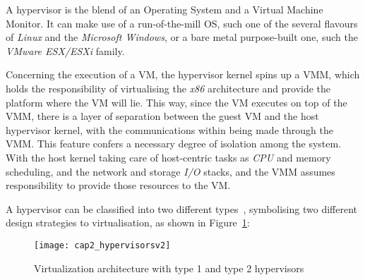 A hypervisor is the blend of an Operating System and a Virtual Machine Monitor. It can make use of a run-of-the-mill OS, such one of the several flavours of \textit{Linux} and the \textit{Microsoft Windows}, or a bare metal purpose-built one, such the \textit{VMware ESX/ESXi} family.

Concerning the execution of a VM, the hypervisor kernel spins up a VMM, which holds the responsibility of virtualising the \textit{x86} architecture and provide the platform where the VM will lie. This way, since the VM executes on top of the VMM, there is a layer of separation between the guest VM and the host hypervisor kernel, with the communications within being made through the VMM. This feature confers a necessary degree of isolation among the system. With the host kernel taking care of host-centric tasks as \textit{CPU} and memory scheduling, and the network and storage \textit{I/O} stacks, and the VMM assumes responsibility to provide those resources to the VM.

A hypervisor can be classified into two different types~\cite{Aneja2011}, symbolising two different design strategies to virtualisation, as shown in Figure~\ref{fig:hypervisors}:

\begin{figure}[htbp]
	\centering
	\texttt{[image: cap2\_hypervisorsv2]}
	\caption{Virtualization architecture with type 1 and type 2 hypervisors}
	\label{fig:hypervisors}
\end{figure}

